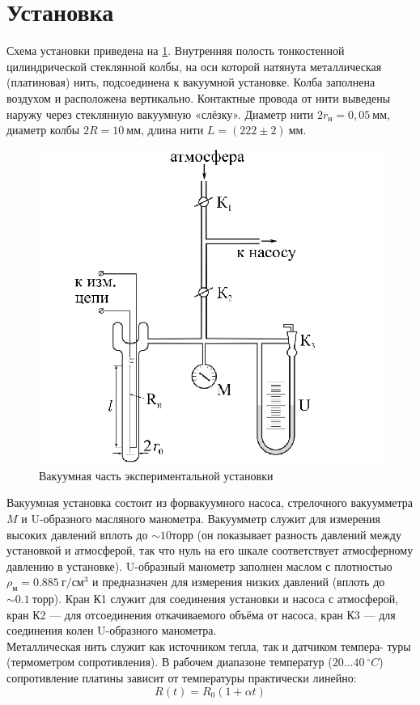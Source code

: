 \documentclass[12pt]{article}
\begin{document}
    \section{Установка}
        Схема установки приведена на \ref{vacuum_part}. Внутренняя полость тонкостенной
        цилиндрической стеклянной колбы, на оси которой натянута металлическая
        (платиновая) нить, подсоединена к вакуумной установке. Колба заполнена
        воздухом и расположена вертикально. Контактные провода от нити выведены
        наружу через стеклянную вакуумную «слёзку».
        Диаметр нити $2r_{\text{н}} = 0,05~\text{мм}$, диаметр колбы $2R = 10~\text{мм}$,
        длина нити $L = (222\pm 2)~\text{мм}$.
        \begin{figure}[H]
            \centering
            \includegraphics[width=0.4\linewidth]{vacuum.png}
            \caption{Вакуумная часть экспериментальной установки}
            \label{vacuum_part}
        \end{figure}
        Вакуумная установка состоит из форвакуумного насоса, стрелочного вакуумметра $M$ и U-образного масляного манометра. Вакуумметр служит для
        измерения высоких давлений вплоть до $\sim 10 \text{торр}$ (он показывает разность
        давлений между установкой и атмосферой, так что нуль на его шкале соответствует атмосферному давлению в установке). U-образный манометр
        заполнен маслом с плотностью $\rho_{\text{м}} = 0.885\ \text{г}/\text{см}^3$ и предназначен для измерения
        низких давлений (вплоть до $\sim 0.1\ \text{торр}$). Кран К1 служит для соединения установки и насоса с атмосферой, кран К2 — для отсоединения откачиваемого
        объёма от насоса, кран К3 — для соединения колен U-образного манометра.\\
        Металлическая нить служит как источником тепла, так и датчиком темпера-
        туры (термометром сопротивления). В рабочем диапазоне температур ($20...40\ ^{\circ} C$)
        сопротивление платины зависит от температуры практически линейно:
        \begin{equation}\label{sopr}
            R(t) = R_0(1+\alpha t)
        \end{equation}
\end{document}
